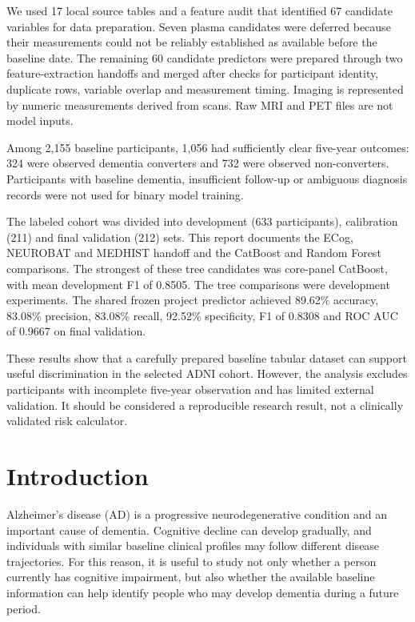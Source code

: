 \documentclass[11pt,a4paper]{article}
\begin{document}
We used 17 local source tables and a feature audit that identified 67 candidate variables for data preparation. Seven plasma candidates were deferred because their measurements could not be reliably established as available before the baseline date. The remaining 60 candidate predictors were prepared through two feature-extraction handoffs and merged after checks for participant identity, duplicate rows, variable overlap and measurement timing. Imaging is represented by numeric measurements derived from scans. Raw MRI and PET files are not model inputs.

Among 2,155 baseline participants, 1,056 had sufficiently clear five-year outcomes: 324 were observed dementia converters and 732 were observed non-converters. Participants with baseline dementia, insufficient follow-up or ambiguous diagnosis records were not used for binary model training.

The labeled cohort was divided into development (633 participants), calibration (211) and final validation (212) sets. This report documents the ECog, NEUROBAT and MEDHIST handoff and the CatBoost and Random Forest comparisons. The strongest of these tree candidates was core-panel CatBoost, with mean development F1 of 0.8505. The tree comparisons were development experiments. The shared frozen project predictor achieved 89.62\% accuracy, 83.08\% precision, 83.08\% recall, 92.52\% specificity, F1 of 0.8308 and ROC AUC of 0.9667 on final validation.

These results show that a carefully prepared baseline tabular dataset can support useful discrimination in the selected ADNI cohort. However, the analysis excludes participants with incomplete five-year observation and has limited external validation. It should be considered a reproducible research result, not a clinically validated risk calculator.

\clearpage\tableofcontents\clearpage
\section{Introduction}
Alzheimer's disease (AD) is a progressive neurodegenerative condition and an important cause of dementia. Cognitive decline can develop gradually, and individuals with similar baseline clinical profiles may follow different disease trajectories. For this reason, it is useful to study not only whether a person currently has cognitive impairment, but also whether the available baseline information can help identify people who may develop dementia during a future period.
\end{document}
